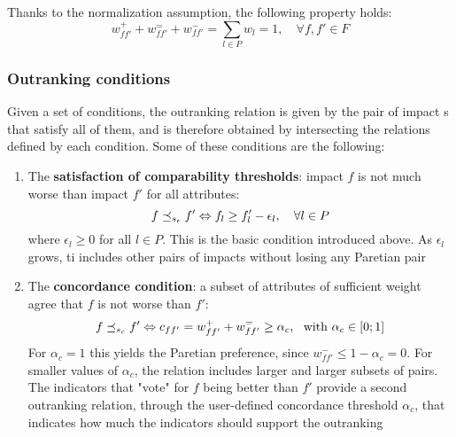 Thanks to the normalization assumption, the following property holds: 
$$ w_{ff'}^+ + w_{ff'}^= + w_{ff'}^- = \sum_{l \in P} w_l = 1, \quad \forall f, f' \in F $$

\subsubsection{Outranking conditions}

Given a set of conditions, the outranking relation is given by the pair of impact s that satisfy all of them, and is therefore obtained by intersecting the relations defined by each condition. Some of these conditions are the following:
\begin{enumerate}
	\item The \textbf{satisfaction of comparability thresholds}: impact $f$ is not much worse than impact $f'$ for all attributes: 
	$$ f \preceq_{s_\epsilon} f' \Leftrightarrow f_l \geq f_l' - \epsilon_l, \quad \forall l \in P $$
	where $\epsilon_l \geq 0$ for all $l \in P$. This is the basic condition introduced above. As $\epsilon_l$ grows, ti includes other pairs of impacts without losing any Paretian pair
	
	\item The \textbf{concordance condition}: a subset of attributes of sufficient weight agree that $f$ is not worse than $f'$:
	$$ f \preceq_{s_c} f' \Leftrightarrow c_{ff'} = w_{ff'}^+ + w_{ff'}^= \geq \alpha_c, \ \text{ with } \alpha_c \in [0; 1] $$
	For $\alpha_c = 1$ this yields the Paretian preference, since $w_{ff'}^- \leq 1 - \alpha_c = 0$. For smaller values of $\alpha_c$, the relation includes larger and larger subsets of pairs. The indicators that "vote" for $f$ being better than $f'$ provide a second outranking relation, through the user-defined concordance threshold $\alpha_c$, that indicates how much the indicators should support the outranking
	

\end{enumerate}
